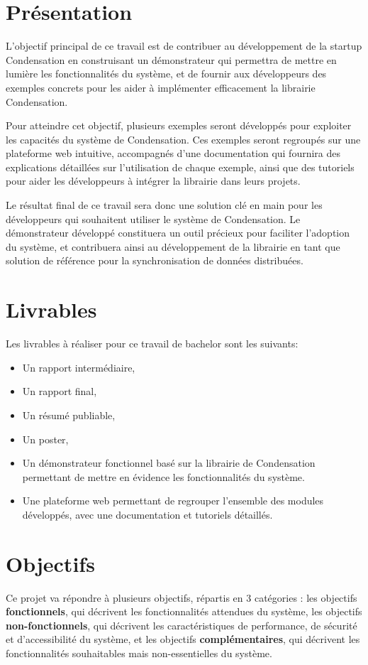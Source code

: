 \section*{Présentation}
L'objectif principal de ce travail est de contribuer au développement de la startup Condensation en construisant un démonstrateur qui permettra de mettre en lumière les fonctionnalités du système, et de fournir aux développeurs des exemples concrets pour les aider à implémenter efficacement la librairie Condensation.

Pour atteindre cet objectif, plusieurs exemples seront développés pour exploiter les capacités du système de Condensation. Ces exemples seront regroupés sur une plateforme web intuitive, accompagnés d'une documentation qui fournira des explications détaillées sur l'utilisation de chaque exemple, ainsi que des tutoriels pour aider les développeurs à intégrer la librairie dans leurs projets.

Le résultat final de ce travail sera donc une solution clé en main pour les développeurs qui souhaitent utiliser le système de Condensation. Le démonstrateur développé constituera un outil précieux pour faciliter l'adoption du système, et contribuera ainsi au développement de la librairie en tant que solution de référence pour la synchronisation de données distribuées.

\section*{Livrables}
Les livrables à réaliser pour ce travail de bachelor sont les suivants:

\begin{itemize}
    \item Un rapport intermédiaire,
    \item Un rapport final,
    \item Un résumé publiable,
    \item Un poster,
    \item Un démonstrateur fonctionnel basé sur la librairie de Condensation permettant de mettre en évidence les fonctionnalités du système.
    \item Une plateforme web permettant de regrouper l'ensemble des modules développés, avec une documentation et tutoriels détaillés.
\end{itemize}

\section*{Objectifs}
Ce projet va répondre à plusieurs objectifs, répartis en 3 catégories : les objectifs \textbf{fonctionnels}, qui décrivent les fonctionnalités attendues du système, les objectifs \textbf{non-fonctionnels}, qui décrivent les caractéristiques de performance, de sécurité et d'accessibilité du système, et les objectifs \textbf{complémentaires}, qui décrivent les fonctionnalités souhaitables mais non-essentielles du système.

